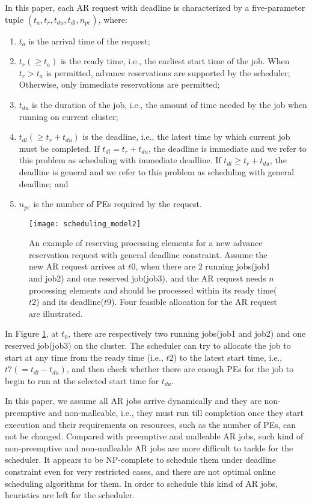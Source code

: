 \documentclass[preprint,12pt]{elsarticle}
\begin{document}
In this paper, each AR request with deadline is characterized by a five-parameter tuple $(t_a, t_r, t_{du}, t_{dl}, n_{pe})$, where:
\begin{enumerate}
    \item $t_a$ is the arrival time of the request;
    \item $t_r (\ge t_a)$ is the ready time, i.e., the earliest start time of the job. When $t_r>t_a$ is permitted, advance reservations are supported by the scheduler; Otherwise, only immediate reservations are permitted;
  \item $t_{du}$ is the duration of the job, i.e., the amount of time needed by the job when running on current cluster;
  \item $t_{dl} (\ge t_r+t_{du})$ is the deadline, i.e., the latest time by which current job must be completed. If $t_{dl}=t_r+t_{du}$, the deadline is immediate and we refer to this problem as scheduling with immediate deadline. If $t_{dl}\ge t_r+t_{du}$, the deadline is general and we refer to this problem as scheduling with general deadline; and
  \item $n_{pe}$ is the number of PEs required by the request.
\end{enumerate}

\begin{figure}[htp]
\centering
\texttt{[image: scheduling\_model2]}
\caption{An example of reserving processing elements for  a new advance reservation request with general deadline constraint. Assume the new AR request arrives at $t0$, when there are 2 running jobs(job1 and job2) and one reserved job(job3), and the AR request needs $n$ processing elements and should be processed within its ready time($t2$) and its deadline($t9$). Four feasible allocation for the AR request are illustrated.}
\label{fig:fig1}
\end{figure}


In Figure \ref{fig:fig1}, at $t_0$, there are respectively two running jobs(job1 and job2) and one reserved job(job3) on the cluster. The scheduler can try to allocate the job to start at any time from the ready time (i.e., $t2$) to the latest start time, i.e., $t7 (=t_{dl}-t_{du})$, and then check whether there are enough PEs for the job to begin to run at the selected start time for $t_{du}$.


In this paper, we assume all AR jobs arrive dynamically and they are non-preemptive and non-malleable, i.e., they must run till completion once they start execution and their requirements on resources, such as the number of PEs, can not be changed. Compared with preemptive and malleable AR jobs\cite{naiksatam2007elastic}, such kind of non-preemptive and non-malleable AR jobs are more difficult to tackle for the scheduler. It appears to be NP-complete to schedule them under deadline constraint even for very restricted cases, and there are not optimal online scheduling algorithms for them\cite{pinedo2008scheduling}. In order to schedule this kind of AR jobs, heuristics are left for the scheduler.
\end{document}
